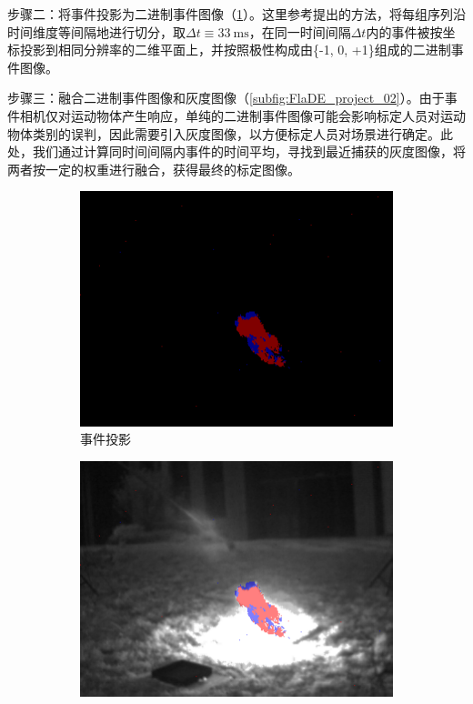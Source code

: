 步骤二：将事件投影为二进制事件图像（\ref{subfig:FlaDE_project_01}）。这里参考\citet{kogler2009bio}提出的方法，将每组序列沿时间维度等间隔地进行切分，取$\Delta{t} \equiv \SI{33}{\milli\second}$，在同一时间间隔$\Delta{t}$内的事件被按坐标投影到相同分辨率的二维平面上，并按照极性构成由\{-1, 0, +1\}组成的二进制事件图像。

步骤三：融合二进制事件图像和灰度图像（\ref{subfig:FlaDE_project_02}）。由于事件相机仅对运动物体产生响应，单纯的二进制事件图像可能会影响标定人员对运动物体类别的误判，因此需要引入灰度图像，以方便标定人员对场景进行确定。此处，我们通过计算同时间间隔内事件的时间平均，寻找到最近捕获的灰度图像，将两者按一定的权重进行融合，获得最终的标定图像。

\begin{figure}[ht]
    \centering
    \begin{subfigure}{0.49\textwidth}
        \centering
        \includegraphics[width=\textwidth]{figures/dataset_project_01.png}
        \caption{事件投影}
        \label{subfig:FlaDE_project_01}
    \end{subfigure}
    \hfill
    \begin{subfigure}{0.49\textwidth}
        \centering
        \includegraphics[width=\textwidth]{figures/dataset_project_02.png}

\end{subfigure}
\end{figure}
